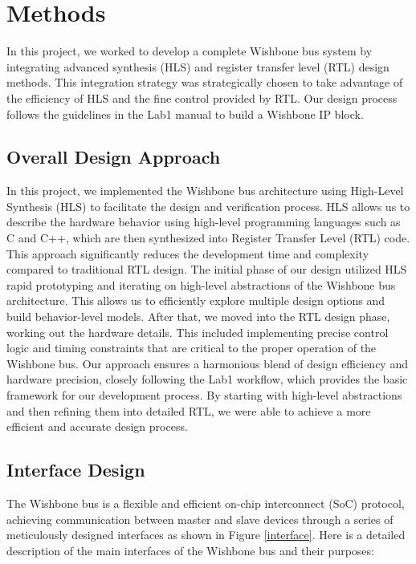 \documentclass[conference]{IEEEtran}
\begin{document}
\section{Methods}
In this project, we worked to develop a complete Wishbone bus system by integrating advanced synthesis (HLS) and register transfer level (RTL) design methods. This integration strategy was strategically chosen to take advantage of the efficiency of HLS and the fine control provided by RTL. Our design process follows the guidelines in the Lab1 manual\cite{ECE4810J_FA2024_Lab1} to build a Wishbone IP block.

\subsection{Overall Design Approach}

In this project, we implemented the Wishbone bus architecture using High-Level Synthesis (HLS) to facilitate the design and verification process. HLS allows us to describe the hardware behavior using high-level programming languages such as C and C++, which are then synthesized into Register Transfer Level (RTL) code. This approach significantly reduces the development time and complexity compared to traditional RTL design. The initial phase of our design utilized HLS rapid prototyping and iterating on high-level abstractions of the Wishbone bus architecture. This allows us to efficiently explore multiple design options and build behavior-level models. After that, we moved into the RTL design phase, working out the hardware details. This included implementing precise control logic and timing constraints that are critical to the proper operation of the Wishbone bus. Our approach ensures a harmonious blend of design efficiency and hardware precision, closely following the Lab1 workflow, which provides the basic framework for our development process. By starting with high-level abstractions and then refining them into detailed RTL, we were able to achieve a more efficient and accurate design process.


\subsection{Interface Design}
The Wishbone bus is a flexible and efficient on-chip interconnect (SoC) protocol, achieving communication between master and slave devices through a series of meticulously designed interfaces as shown in Figure \ref{interface}. Here is a detailed description of the main interfaces of the Wishbone bus and their purposes:
\end{document}
